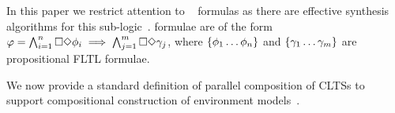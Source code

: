 %
%

In this paper we restrict attention to \gr~\cite{DBLP:journals/jcss/BloemJPPS12} formulas as there are effective synthesis algorithms for this sub-logic~\cite{DBLP:journals/jcss/BloemJPPS12}. \gr formulae are of the form $\varphi = \bigwedge_{i=1}^n \square\Diamond \phi_i \implies \bigwedge_{j=1}^m \square\Diamond \gamma_j$, where $\{\phi_1 \ldots \phi_n\}$ and $\{\gamma_1 \ldots \gamma_m\}$ are propositional FLTL formulae.



We now provide a standard definition of parallel composition of CLTSs to support compositional construction of environment models~\cite{DBLP:journals/cacm/Hoare78}.


